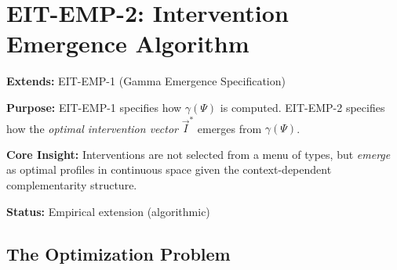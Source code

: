 %
%

\section{EIT-EMP-2: Intervention Emergence Algorithm}
\label{sec:ie-emp2-algorithm}

\begin{tcolorbox}[colback=purple!5!white, colframe=purple!75!black,
    title=\textbf{Empirical Extension EIT-EMP-2: Intervention Emergence Algorithm}]

\textbf{Extends:} EIT-EMP-1 (Gamma Emergence Specification)

\textbf{Purpose:} EIT-EMP-1 specifies how $\gamma(\Psi)$ is computed.
EIT-EMP-2 specifies how the \textit{optimal intervention vector} $\vec{I}^*$ emerges from $\gamma(\Psi)$.

\textbf{Core Insight:} Interventions are not selected from a menu of types, but \textit{emerge} as optimal profiles in continuous space given the context-dependent complementarity structure.

\textbf{Status:} Empirical extension (algorithmic)

\end{tcolorbox}

\subsection{The Optimization Problem}
\label{subsec:emp2-optimization}

